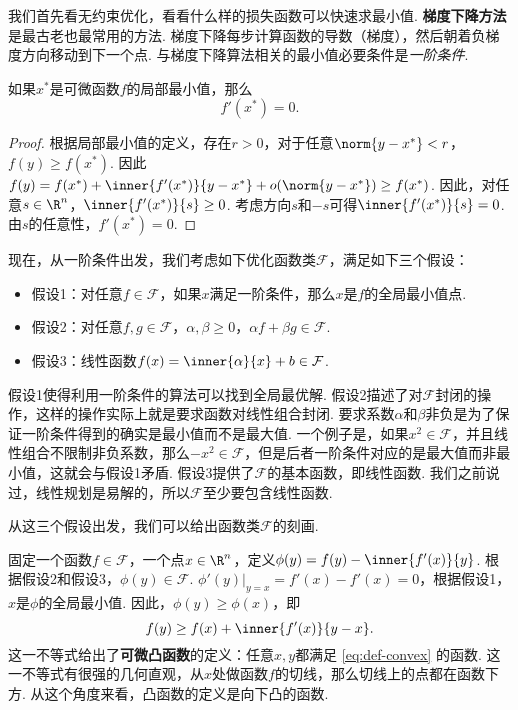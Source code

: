 我们首先看无约束优化，看看什么样的损失函数可以快速求最小值. \textbf{梯度下降方法}是最古老也最常用的方法. 梯度下降每步计算函数的导数（梯度），然后朝着负梯度方向移动到下一个点. 与梯度下降算法相关的最小值必要条件是\emph{一阶条件}. 

\begin{theorem}[一阶条件]
    如果$x^*$是可微函数$f$的局部最小值，那么
    \[f'(x^*)=0.\]
\end{theorem}

\begin{proof}
根据局部最小值的定义，存在$r>0$，对于任意$\norm{y-x^*}<r$，$f(y)\geq f(x^*)$. 因此$f(y)=f(x^*)+\inner{f'(x^*)}{y-x^*}+o(\norm{y-x^*})\geq f(x^*)$. 因此，对任意$s\in\R^n$，$\inner{f'(x^*)}{s}\geq 0$. 考虑方向$s$和$-s$可得$\inner{f'(x^*)}{s}=0$. 由$s$的任意性，$f'(x^*)=0$.
\end{proof}

\renewcommand{\F}{\mathcal{F}}

现在，从一阶条件出发，我们考虑如下优化函数类$\F$，满足如下三个假设：
\begin{itemize}
    \item 假设1：对任意$f\in\F$，如果$x$满足一阶条件，那么$x$是$f$的全局最小值点.
    \item 假设2：对任意$f,g\in\F$，$\alpha,\beta\geq 0$，$\alpha f+\beta g\in\F$.
    \item 假设3：线性函数$f(x)=\inner{\alpha}{x}+b\in\F$.
\end{itemize}
假设1使得利用一阶条件的算法可以找到全局最优解. 假设2描述了对$\F$封闭的操作，这样的操作实际上就是要求函数对线性组合封闭. 要求系数$\alpha$和$\beta$非负是为了保证一阶条件得到的确实是最小值而不是最大值. 一个例子是，如果$x^2\in\F$，并且线性组合不限制非负系数，那么$-x^2\in\F$，但是后者一阶条件对应的是最大值而非最小值，这就会与假设1矛盾.  假设3提供了$\F$的基本函数，即线性函数. 我们之前说过，线性规划是易解的，所以$\F$至少要包含线性函数. 

从这三个假设出发，我们可以给出函数类$\F$的刻画. 

固定一个函数$f\in\F$，一个点$x\in\R^n$，定义$\phi(y)=f(y)-\inner{f'(x)}{y}$. 根据假设2和假设3，$\phi(y)\in\F$. $\phi'(y)|_{y=x}=f'(x)-f'(x)=0$，根据假设1，$x$是$\phi$的全局最小值. 因此，$\phi(y)\geq\phi(x)$，即
\begin{equation}
    f(y)\geq f(x)+\inner{f'(x)}{y-x}.\label{eq:def-convex}
\end{equation}
这一不等式给出了\textbf{可微凸函数}的定义：任意$x,y$都满足 \eqref{eq:def-convex} 的函数. 这一不等式有很强的几何直观，从$x$处做函数$f$的切线，那么切线上的点都在函数下方. 从这个角度来看，凸函数的定义是向下凸的函数. 

